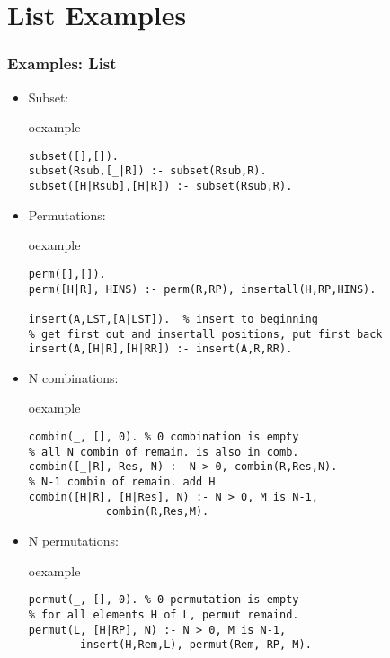 \section{List Examples}
\begin{frame}[fragile]
\frametitle{Examples: List}
\begin{itemize}
\item Subset:\\
\begin{beamercolorbox}{oexample}
\begin{lstlisting}[escapeinside=`']
subset([],[]).
subset(Rsub,[_|R]) :- subset(Rsub,R).
subset([H|Rsub],[H|R]) :- subset(Rsub,R).
\end{lstlisting}
\end{beamercolorbox}
\item Permutations:\\
\begin{beamercolorbox}{oexample}
\begin{lstlisting}[escapeinside=`']
% insert H to all positions in the remainder permutations
perm([],[]).
perm([H|R], HINS) :- perm(R,RP), insertall(H,RP,HINS).

insert(A,LST,[A|LST]).  % insert to beginning
% get first out and insertall positions, put first back
insert(A,[H|R],[H|RR]) :- insert(A,R,RR). 
\end{lstlisting}
\end{beamercolorbox}
\end{itemize}
\end{frame}

\begin{frame}[fragile]
\begin{itemize}
\item N combinations:\\
\begin{beamercolorbox}{oexample}
\begin{lstlisting}[escapeinside=`']
combin(_, [], 0). % 0 combination is empty
% all N combin of remain. is also in comb.
combin([_|R], Res, N) :- N > 0, combin(R,Res,N).
% N-1 combin of remain. add H
combin([H|R], [H|Res], N) :- N > 0, M is N-1, 
            combin(R,Res,M).
\end{lstlisting}
\end{beamercolorbox}
\item N permutations:\\
\begin{beamercolorbox}{oexample}
\begin{lstlisting}[escapeinside=`']
permut(_, [], 0). % 0 permutation is empty
% for all elements H of L, permut remaind.
permut(L, [H|RP], N) :- N > 0, M is N-1, 
        insert(H,Rem,L), permut(Rem, RP, M).
\end{lstlisting}
\end{beamercolorbox}
\end{itemize}
\end{frame}

